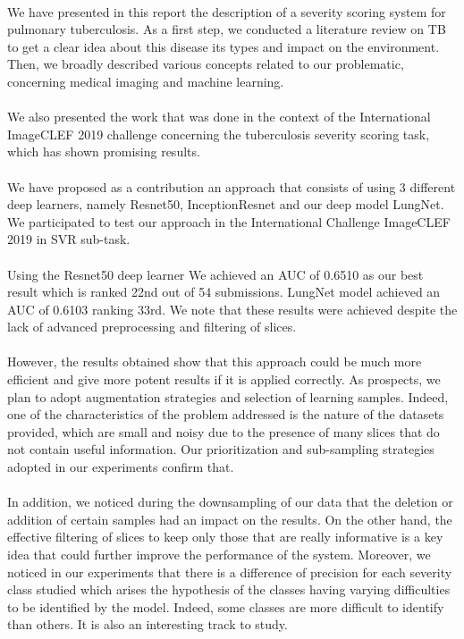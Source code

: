 \paragraph{}
We have presented in this report the description of a severity scoring system for pulmonary tuberculosis. As a first step, we conducted a literature review on TB to get a clear idea about this disease its types and impact on the environment. Then, we broadly described various concepts related to our problematic, concerning medical imaging and machine learning.
\paragraph{}
We also presented the work that was done in the context of the International ImageCLEF 2019 challenge concerning the tuberculosis severity scoring task, which has shown promising results.
\paragraph{}
We have proposed as a contribution an approach that consists of using 3 different deep learners, namely Resnet50, InceptionResnet and our deep model LungNet. We participated to test our approach in the International Challenge ImageCLEF 2019 in SVR sub-task. 
\paragraph{}
Using the Resnet50 deep learner We achieved an AUC of 0.6510  as our best result which is ranked 22nd out of 54 submissions. LungNet model achieved an AUC of 0.6103 ranking 33rd. We note that these results were achieved despite the lack of advanced preprocessing and filtering of slices. 
\paragraph{}
However, the results obtained show that this approach could be much more efficient and give more potent results if it is applied correctly. As prospects, we plan to adopt augmentation strategies and selection of learning samples. Indeed, one of the characteristics of the problem addressed is the nature of the datasets provided, which are small and noisy due to the presence of many slices that do not contain useful information. Our prioritization and sub-sampling strategies adopted in our experiments confirm that. 
\paragraph{}
In addition, we noticed during the downsampling of our data that the deletion or addition of certain samples had an impact on the results. On the other hand, the effective filtering of slices to keep only those that are really informative is a key idea that could further improve the performance of the system. Moreover, we noticed in our experiments that there is a difference of precision for each severity class studied which arises the hypothesis of the classes having varying difficulties to be identified by the model. Indeed, some classes are more difficult to identify than others. It is also an interesting track to study. 

